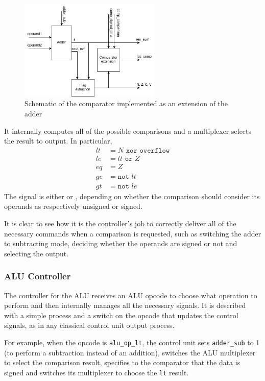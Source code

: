 \begin{figure}[htbp]
    \center
	\includegraphics[width=0.6\textwidth]{./2-implementation/images/comparator.png}
	\caption{Schematic of the comparator implemented as an extension of the adder}
	\label{fig:comparator}
\end{figure}

It internally computes all of the possible comparisons and a multiplexer selects the result to output. In particular,
\begin{align*}
    lt &= N \texttt{ xor } \texttt{overflow} \\
    le &= lt \texttt{ or } Z \\
    eq &= Z \\
    ge &= \texttt{not } lt \\
    gt &= \texttt{not } le
\end{align*}
The  signal is either  or ,
depending on whether the comparison should consider its operands as respectively unsigned or signed.

It is clear to see how it is the controller's job to correctly deliver all of the necessary commands when a comparison
is requested, such as switching the adder to subtracting mode, deciding whether the operands are signed or not and
selecting the output.

\subsubsection{ALU Controller}
The controller for the ALU receives an ALU opcode to choose what operation to perform and then internally manages all
the necessary signals. It is described with a simple process and a switch on the opcode that updates the control
signals, as in any classical control unit output process.

For example, when the opcode is \texttt{alu\_op\_lt}, the control unit sets \texttt{adder\_sub} to 1 (to perform a
subtraction instead of an addition), switches the ALU multiplexer to select the comparison result, specifies to the
comparator that the data is signed and switches its multiplexer to choose the \texttt{lt} result.

